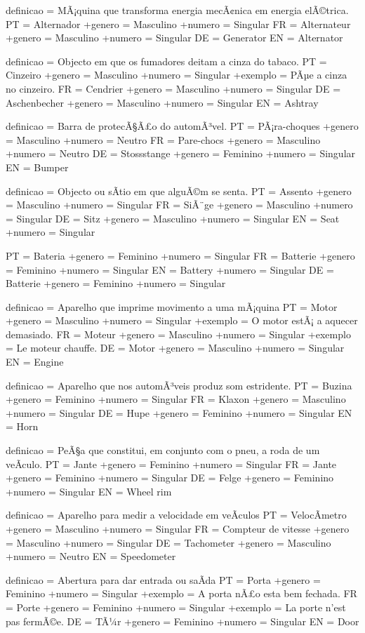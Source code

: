 \documentclass[a4paper]{article}
\begin{document}
definicao = MÃ¡quina que transforma energia mecÃ¢nica em energia elÃ©trica.
PT = Alternador
+genero = Masculino
+numero = Singular
FR = Alternateur
+genero = Masculino
+numero = Singular
DE = Generator
EN = Alternator

definicao = Objecto em que os fumadores deitam a cinza do tabaco.
PT = Cinzeiro
+genero = Masculino
+numero = Singular
+exemplo = PÃµe a cinza no cinzeiro.
FR = Cendrier
+genero = Masculino
+numero = Singular
DE = Aschenbecher
+genero = Masculino
+numero = Singular
EN = Ashtray

definicao = Barra de protecÃ§Ã£o do automÃ³vel.
PT = PÃ¡ra-choques
+genero = Masculino
+numero = Neutro
FR = Pare-chocs
+genero = Masculino
+numero = Neutro
DE = Stossstange
+genero = Feminino
+numero = Singular
EN = Bumper

definicao = Objecto ou sÃ\-tio em que alguÃ©m se senta.
PT = Assento
+genero = Masculino
+numero = Singular
FR = SiÃ¨ge
+genero = Masculino
+numero = Singular
DE = Sitz
+genero = Masculino
+numero = Singular
EN = Seat
+numero = Singular

PT = Bateria
+genero = Feminino
+numero = Singular
FR = Batterie
+genero = Feminino
+numero = Singular
EN = Battery
+numero = Singular
DE = Batterie
+genero = Feminino
+numero = Singular

definicao = Aparelho que imprime movimento a uma mÃ¡quina
PT = Motor
+genero = Masculino
+numero = Singular
+exemplo = O motor estÃ¡ a aquecer demasiado.
FR = Moteur
+genero = Masculino
+numero = Singular
+exemplo = Le moteur chauffe.
DE = Motor
+genero = Masculino
+numero = Singular
EN = Engine

definicao = Aparelho que nos automÃ³veis produz som estridente.
PT = Buzina
+genero = Feminino
+numero = Singular
FR = Klaxon
+genero = Masculino
+numero = Singular
DE = Hupe
+genero = Feminino
+numero = Singular
EN = Horn

definicao = PeÃ§a que constitui, em conjunto com o pneu, a roda de um veÃ\-culo.
PT = Jante
+genero = Feminino
+numero = Singular
FR = Jante
+genero = Feminino
+numero = Singular
DE = Felge
+genero = Feminino
+numero = Singular
EN = Wheel rim

definicao = Aparelho para medir a velocidade em veÃ\-culos
PT = VelocÃ\-metro
+genero = Masculino
+numero = Singular
FR = Compteur de vitesse
+genero = Masculino
+numero = Singular
DE = Tachometer
+genero = Masculino
+numero = Neutro
EN = Speedometer

definicao = Abertura para dar entrada ou saÃ\-da
PT = Porta
+genero = Feminino
+numero = Singular
+exemplo = A porta nÃ£o esta bem fechada.
FR = Porte
+genero = Feminino
+numero = Singular
+exemplo = La porte n'est pas fermÃ©e.
DE = TÃ¼r
+genero = Feminino
+numero = Singular
EN = Door
\end{document}
